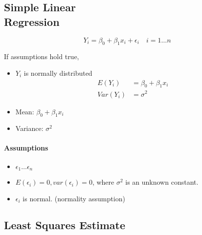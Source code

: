 \documentclass[10pt]{article}
\begin{document}
\begin{multicols}{3}



    \tableofcontents

    \section[Simple Linear Regression]{Simple Linear \\Regression}

    \begin{equation}\label{eq: simple linear regression}
        Y_i = \beta_0 + \beta_1 x_i + \epsilon_i \quad i = 1\dots n
    \end{equation}

    If assumptions hold true,

    \begin{itemize}
        \item $Y_i$ is normally distributed
              \begin{align}
                  E(Y_i)   & = \beta_0 + \beta_1 x_i \\
                  Var(Y_i) & = \sigma^2
              \end{align}
        \item Mean: $\beta_0 + \beta_1 x_i$
        \item Variance: $\sigma^2$
    \end{itemize}


    \paragraph{Assumptions}

    \begin{itemize}
        \item $\epsilon_1 \dots \epsilon_n$
        \item $E(\epsilon_i) = 0, var(\epsilon_i)=0$, where $\sigma^2$ is an unknown constant.
        \item $\epsilon_i$ is normal. (normality assumption)
    \end{itemize}

    \subsection{Least Squares Estimate}


\end{multicols}
\end{document}
